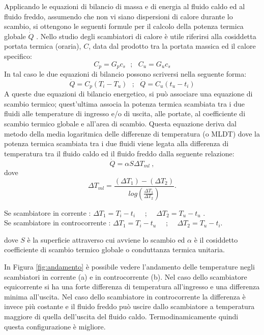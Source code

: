 \documentclass[laurea,oneside,11pt]{USiena_tesiLM3}
\begin{document}
Applicando le equazioni di bilancio di massa e di energia al fluido caldo ed al fluido freddo, assumendo che non vi siano dispersioni di calore durante lo scambio, si ottengono le seguenti formule per il calcolo della potenza termica globale $\dot{Q}$ \cite{pistocchini2010ottimizzazione}. Nello studio degli scambiatori di calore è  utile riferirsi alla cosiddetta portata termica (oraria), $C$, data dal prodotto tra la portata massica ed il calore specifico:
\begin{equation}
C_p=G_p c_s  \ \ \ ; \ \ \ C_u=G_u c_s
\end{equation}
In tal caso le due equazioni di bilancio  possono scriversi nella seguente forma:
\begin{equation}
\dot{Q}=C_p(T_i - T_u) \ \ \ ; \ \ \ \dot{Q}=C_u(t_u - t_i)
\label{eq:scambiatore1}
\end{equation}
A queste due equazioni di bilancio energetico, si può associare una equazione di scambio termico; quest'ultima associa la potenza termica scambiata tra i due fluidi alle temperature di ingresso e/o di uscita, alle portate, al coefficiente di scambio termico globale e all'area di scambio. Questa equazione deriva dal metodo della media logaritmica delle differenze di temperatura (o MLDT) dove  la potenza termica scambiata tra i due fluidi viene legata alla differenza di temperatura tra il fluido caldo ed il fluido freddo dalla seguente relazione:
\begin{equation}
\dot{Q}=\alpha S \Delta T_{ml}  \ ,
\end{equation}
dove
\begin{equation}
 \Delta T_{ml} = \frac{(\Delta T_1)-(\Delta T_2)}{log\left( \frac{\Delta T_1}{\Delta T_2} \right)} .
 \label{eq:scambiatore2}
 \end{equation}
 \begin{center}
 Se scambiatore in corrente : $ \Delta T_1 = T_i - t_i $  \ \ ; \ \ $ \Delta T_2 = T_u - t_u $ .  \\
 
 Se scambiatore in controcorrente : $ \Delta T_1 = T_i - t_u $  \ \ ; \ \ $ \Delta T_2 = T_u - t_i . $ 
\end{center}
dove $S$ \`e  la superficie attraverso cui avviene lo scambio ed $\alpha$ \`e  il cosiddetto coefficiente di scambio termico globale o conduttanza termica unitaria. 

In Figura \ref{fig:andamento} è  possibile vedere l'andamento delle temperature negli scambiatori in corrente (a) e in controcorrente (b).
Nel caso dello scambiatore equicorrente si ha una forte differenza di temperatura all'ingresso e una differenza  minima  all'uscita.  Nel  caso  dello  scambiatore in controcorrente  la  differenza  è invece più costante e il fluido freddo può uscire dallo scambiatore a temperatura maggiore di  quella  dell'uscita del fluido  caldo. 
Termodinamicamente quindi  questa  configurazione  è migliore. 
\end{document}
